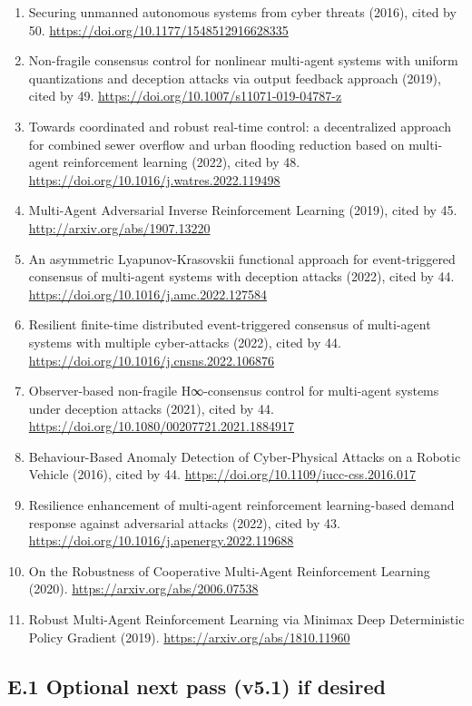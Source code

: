 \documentclass[
]{article}
\begin{document}
\begin{enumerate}
  \url{https://doi.org/10.1109/tsg.2022.3164080}
\item
  Securing unmanned autonomous systems from cyber threats (2016), cited
  by 50. \url{https://doi.org/10.1177/1548512916628335}
\item
  Non-fragile consensus control for nonlinear multi-agent systems with
  uniform quantizations and deception attacks via output feedback
  approach (2019), cited by 49.
  \url{https://doi.org/10.1007/s11071-019-04787-z}
\item
  Towards coordinated and robust real-time control: a decentralized
  approach for combined sewer overflow and urban flooding reduction
  based on multi-agent reinforcement learning (2022), cited by 48.
  \url{https://doi.org/10.1016/j.watres.2022.119498}
\item
  Multi-Agent Adversarial Inverse Reinforcement Learning (2019), cited
  by 45. \url{http://arxiv.org/abs/1907.13220}
\item
  An asymmetric Lyapunov-Krasovskii functional approach for
  event-triggered consensus of multi-agent systems with deception
  attacks (2022), cited by 44.
  \url{https://doi.org/10.1016/j.amc.2022.127584}
\item
  Resilient finite-time distributed event-triggered consensus of
  multi-agent systems with multiple cyber-attacks (2022), cited by 44.
  \url{https://doi.org/10.1016/j.cnsns.2022.106876}
\item
  Observer-based non-fragile H∞-consensus control for multi-agent
  systems under deception attacks (2021), cited by 44.
  \url{https://doi.org/10.1080/00207721.2021.1884917}
\item
  Behaviour-Based Anomaly Detection of Cyber-Physical Attacks on a
  Robotic Vehicle (2016), cited by 44.
  \url{https://doi.org/10.1109/iucc-css.2016.017}
\item
  Resilience enhancement of multi-agent reinforcement learning-based
  demand response against adversarial attacks (2022), cited by 43.
  \url{https://doi.org/10.1016/j.apenergy.2022.119688}
\item
  On the Robustness of Cooperative Multi-Agent Reinforcement Learning
  (2020). \url{https://arxiv.org/abs/2006.07538}
\item
  Robust Multi-Agent Reinforcement Learning via Minimax Deep
  Deterministic Policy Gradient (2019).
  \url{https://arxiv.org/abs/1810.11960}
\end{enumerate}

\hypertarget{e.1-optional-next-pass-v5.1-if-desired}{%
\subsection{E.1 Optional next pass (v5.1) if
desired}\label{e.1-optional-next-pass-v5.1-if-desired}}
\end{document}
